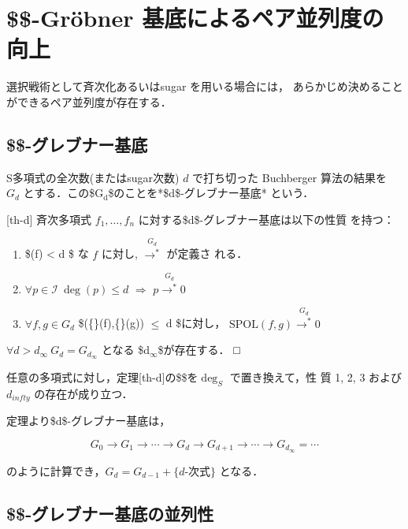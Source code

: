 \documentclass[a4j,12pt]{jarticle}
\begin{document}
{{\section{\$\$-Gröbner 基底によるペア並列度の向上}
\label{sec:org1ae2516}

選択戦術として斉次化あるいはsugar を用いる場合には，
あらかじめ決めることができるペア並列度が存在する．

\subsection{\$\$-グレブナー基底}
\label{sec:org9b63a92}

S多項式の全次数(またはsugar次数) \(d\) で打ち切った Buchberger
算法の結果を \(G_d\) とする．この\$G\(_{\text{d}}\)\$のことを*\$d\$-グレブナー基底*
という．

[th-d] 斉次多項式 \(f_1, \ldots, f_n\)
に対する\$d\$-グレブナー基底は以下の性質 を持つ：

\begin{enumerate}
\item \$\textdegree{}(f) < d \$ な \(f\) に対し,
\({{\!\stackrel{G_d}{\longrightarrow^{*}} }}\) が定義さ れる．

\item \(\forall p \in {\mathcal{I}} \ \deg(p) \le d\) \(\Rightarrow\)
\({{p\!\stackrel{G_d}{\longrightarrow^{*}} 0}}\)

\item \(\forall f, g \in G_d\)
\$\textdegree{}(\{\}(f),\{\}(g)) \(\le\) d \$に対し，
\({{{\mathrm{SPOL}}(f, g)\!\stackrel{G_d}{\longrightarrow^{*}} 0}}\)
\end{enumerate}

\(\forall d > d_\infty \ G_d = G_{d_\infty}\) となる
\$d\(_{\infty}\)\$が存在する． □

任意の多項式に対し，定理[th-d]の\$\textdegree{}\$を\(\deg_S\) で置き換えて，性 質 1,
2, 3 および\(d_{infty}\) の存在が成り立つ．

定理より\$d\$-グレブナー基底は，

$$G_0 \rightarrow
G_1 \rightarrow
\cdots \rightarrow
G_{d} \rightarrow 
G_{d+1} \rightarrow 
\cdots \rightarrow
G_{d_\infty} = \cdots$$

のように計算でき，\(G_d = G_{d-1} + \{d\mbox{-次式}\}\) となる．

\subsection{\$\$-グレブナー基底の並列性}
\label{sec:org5ed54f9}

}}
\end{document}
